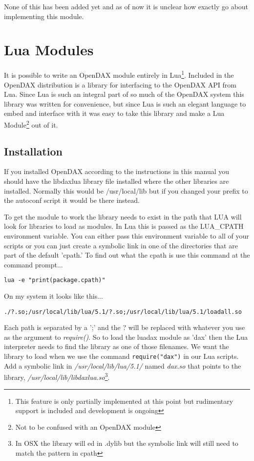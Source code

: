 None of this has been added yet and as of now it is unclear how exactly go about implementing this module.

\chapter{Lua Modules}

It is possible to write an OpenDAX module entirely in Lua\footnote{This feature is only partially implemented at this point but rudimentary support is included and development is ongoing}.  Included in the OpenDAX distribution is a library for interfacing to the OpenDAX API from Lua.  Since Lua is such an integral part of so much of the OpenDAX system this library was written for convenience, but since Lua is such an elegant language to embed and interface with it was easy to take this library and make a Lua Module\footnote{Not to be confused with an OpenDAX module} out of it. 

\section{Installation}

If you installed OpenDAX according to the instructions in this manual you should have the libdaxlua library file installed where the other libraries are installed.  Normally this would be /usr/local/lib but if you changed your prefix to the autoconf script it would be there instead.

To get the module to work the library needs to exist in the path that LUA will look for libraries to load as modules.  In Lua this is passed as the LUA\_CPATH environment variable.  You can either pass this environment variable to all of your scripts or you can just create a symbolic link in one of the directories that are part of the default 'cpath.'  To find out what the cpath is use this command at the command prompt...

\verb|lua -e "print(package.cpath)"|

On my system it looks like this...

\verb|./?.so;/usr/local/lib/lua/5.1/?.so;/usr/local/lib/lua/5.1/loadall.so|

Each path is separated by a ';' and the ? will be replaced with whatever you use as the argument to \textit{require()}.  So to load the luadax module as 'dax' then the Lua interpreter needs to find the library as one of those filenames.  We want the library to load when we use the command \verb|require("dax")| in our Lua scripts.  Add a symbolic link in \textit{/usr/local/lib/lua/5.1/} named \textit{dax.so} that points to the library, \textit{/usr/local/lib/libdaxlua.so}\footnote{In OSX the library will ed in .dylib but the symbolic link will still need to match the pattern in cpath}.

